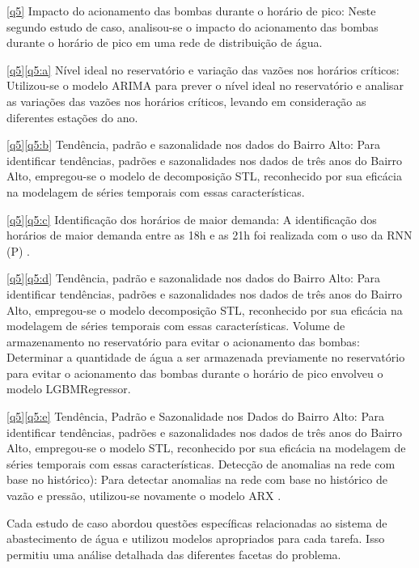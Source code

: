 \eqref{q5} Impacto do acionamento das bombas durante o horário de pico: Neste segundo estudo de caso, analisou-se o impacto do acionamento das bombas durante o horário de pico em uma rede de distribuição de água.

\ref{q5}\eqref{q5:a} Nível ideal no reservatório e variação das vazões nos horários críticos: Utilizou-se o modelo ARIMA \cite{2-s2.0-85069459067} para prever o nível ideal no reservatório e analisar as variações das vazões nos horários críticos, levando em consideração as diferentes estações do ano.

\ref{q5}\eqref{q5:b} Tendência, padrão e sazonalidade nos dados do Bairro Alto: Para identificar tendências, padrões e sazonalidades nos dados de três anos do Bairro Alto, empregou-se o modelo de decomposição STL, reconhecido por sua eficácia na modelagem de séries temporais com essas características.

\ref{q5}\eqref{q5:c} Identificação dos horários de maior demanda: A identificação dos horários de maior demanda entre as 18h e as 21h foi realizada com o uso da RNN (P) \cite{2-s2.0-85067419084}.

\ref{q5}\eqref{q5:d} Tendência, padrão e sazonalidade nos dados do Bairro Alto: Para identificar tendências, padrões e sazonalidades nos dados de três anos do Bairro Alto, empregou-se o modelo decomposição STL, reconhecido por sua eficácia na modelagem de séries temporais com essas características. Volume de armazenamento no reservatório para evitar o acionamento das bombas: Determinar a quantidade de água a ser armazenada previamente no reservatório para evitar o acionamento das bombas durante o horário de pico envolveu o modelo LGBMRegressor.

\ref{q5}\eqref{q5:e} Tendência, Padrão e Sazonalidade nos Dados do Bairro Alto: Para identificar tendências, padrões e sazonalidades nos dados de três anos do Bairro Alto, empregou-se o modelo STL, reconhecido por sua eficácia na modelagem de séries temporais com essas características. Detecção de anomalias na rede com base no histórico): Para detectar anomalias na rede com base no histórico de vazão e pressão, utilizou-se novamente o modelo ARX \cite{2-s2.0-85051469381}.

Cada estudo de caso abordou questões específicas relacionadas ao sistema de abastecimento de água e utilizou modelos apropriados para cada tarefa. Isso permitiu uma análise detalhada das diferentes facetas do problema.

